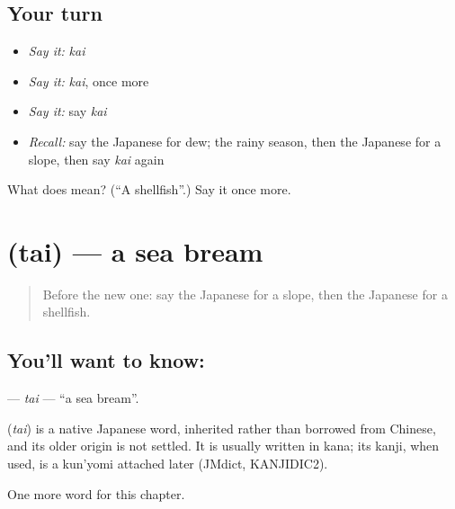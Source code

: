 \subsection*{Your turn}
\begin{itemize}
\raggedright
  \item \emph{Say it:} \emph{kai}
  \item \emph{Say it:} \emph{kai}, once more
  \item \emph{Say it:} say \emph{kai}
  \item \emph{Recall:} say the Japanese for dew; the rainy season, then the Japanese for a slope, then say \emph{kai} again
\end{itemize}

\begin{tcolorbox}[breakable,colback=teal!4,colframe=teal!35!black,title={Before you move on}]
What does  mean? (\textquotedblleft{}A shellfish\textquotedblright{}.) Say it once more.
\end{tcolorbox}
\section[\texorpdfstring{\ja{たい} (tai)}{たい (tai)}]{ (tai) — a sea bream}

\label{lesson:JA-C108-tai}



\begin{quote}
Before the new one: say the Japanese for a slope, then the Japanese for a shellfish.
\end{quote}

\subsection*{You'll want to know: }
\textbf{} — \emph{tai} — \textquotedblleft{}a sea bream\textquotedblright{}.

\begin{cousinweb}
\textbf{} (\emph{tai}) is a native Japanese word, inherited rather than borrowed from Chinese, and its older origin is not settled. It is usually written in kana; its kanji, when used, is a kun'yomi attached later (JMdict, KANJIDIC2).
\end{cousinweb}

\begin{grammarlens}[title={What you've built}]
One more word for this chapter.
\end{grammarlens}

